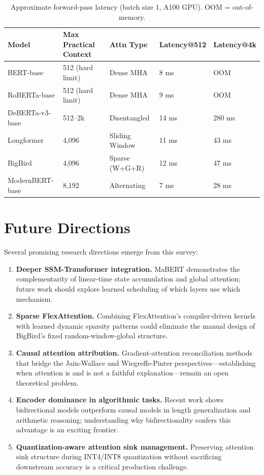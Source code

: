 \documentclass[11pt]{article}
\begin{document}
\begin{table}[h]
\centering
\renewcommand{\arraystretch}{1.3}
\begin{tabular}{@{}lllll@{}}
\toprule
\textbf{Model} & \textbf{Max Practical Context} & \textbf{Attn Type} & \textbf{Latency@512} & \textbf{Latency@4k} \\
\midrule
BERT-base      & 512 (hard limit) & Dense MHA       & 8 ms   & OOM \\
RoBERTa-base   & 512 (hard limit) & Dense MHA       & 9 ms   & OOM \\
DeBERTa-v3-base & 512–2k          & Disentangled    & 14 ms  & 280 ms \\
Longformer     & 4,096            & Sliding Window  & 11 ms  & 43 ms \\
BigBird        & 4,096            & Sparse (W+G+R)  & 12 ms  & 47 ms \\
ModernBERT-base & 8,192            & Alternating     & 7 ms   & 28 ms \\
\bottomrule
\end{tabular}
\caption{Approximate forward-pass latency (batch size 1, A100 GPU). OOM = out-of-memory.}
\label{tab:limits}
\end{table}

\section{Future Directions}

Several promising research directions emerge from this survey:
\begin{enumerate}[label=(\roman*)]
  \item \textbf{Deeper SSM-Transformer integration.} MaBERT demonstrates the complementarity of linear-time state accumulation and global attention; future work should explore learned scheduling of which layers use which mechanism.
  \item \textbf{Sparse FlexAttention.} Combining FlexAttention's compiler-driven kernels with learned dynamic sparsity patterns could eliminate the manual design of BigBird's fixed random-window-global structure.
  \item \textbf{Causal attention attribution.} Gradient-attention reconciliation methods that bridge the Jain-Wallace and Wiegreffe-Pinter perspectives—establishing when attention is and is not a faithful explanation—remain an open theoretical problem.
  \item \textbf{Encoder dominance in algorithmic tasks.} Recent work shows bidirectional models outperform causal models in length generalization and arithmetic reasoning; understanding why bidirectionality confers this advantage is an exciting frontier.
  \item \textbf{Quantization-aware attention sink management.} Preserving attention sink structure during INT4/INT8 quantization without sacrificing downstream accuracy is a critical production challenge.
\end{enumerate}
\end{document}
